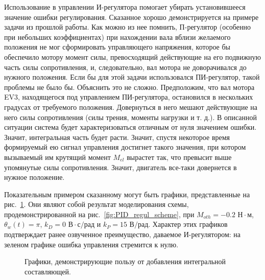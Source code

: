 \documentclass[12pt,a4paper,openany]{extarticle}
\begin{document}
Использование в управлении И-регулятора помогает убирать установившееся значение ошибки регулирования.
Сказанное хорошо демонстрируется на примере задачи из прошлой работы.
Как можно из нее помнить, П-регулятор (особенно при небольших коэффициентах) при нахождении вала вблизи желаемого положения не мог сформировать управляющего напряжения, которое бы обеспечило мотору момент силы, превосходящий действующие на его подвижную часть силы сопротивления, и, следовательно, вал мотора не доворачивался до нужного положения.
Если бы для этой задачи использовался ПИ-регулятор, такой проблемы не было бы.
Объяснить это не сложно.
Предположим, что вал мотора EV3, находящегося под управлением ПИ-регулятора, остановился в нескольких градусах от требуемого положения. Довернуться в него мешают действующие на него силы сопротивления (силы трения, моменты нагрузки и т. д.).
В описанной ситуации система будет характеризоваться отличным от нуля значением ошибки.
Значит, интегральная часть будет расти.
Значит, спустя некоторое время формируемый ею сигнал управления достигнет такого значения, при котором вызываемый им крутящий момент $M_{el}$ вырастет так, что превысит выше упомянутые силы сопротивления.
Значит, двигатель все-таки довернется в нужное положение.

Показательным примером сказанному могут быть графики, представленные на рис.~\ref{fig:PI_regul_achievs}.
Они являют собой результат моделирования схемы, продемонстрированной на рис.~\ref{fig:PID_regul_scheme}, при $M_{oth} = -0.2\text{ Н}{\cdot}\text{м}$, $\theta_w(t)=\pi$, $k_D = 0\text{ В}{\cdot}\text{с}/\text{рад}$ и $k_P = 15\text{ В/рад}$.
Характер этих графиков подтверждает ранее озвученное преимущество, даваемое И-регулятором: на зеленом графике ошибка управления стремится к нулю.

\begin{figure}[h!]
	\vspace{-1cm}
	\caption{Графики, демонстрирующие пользу от добавления интегральной составляющей.}
	\label{fig:PI_regul_achievs}
\end{figure}	
\end{document}
